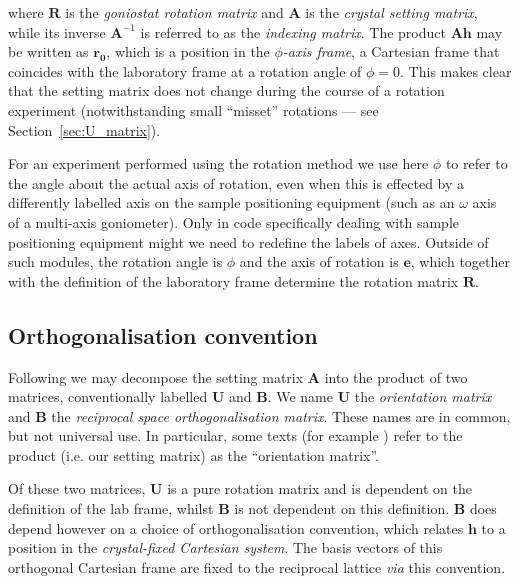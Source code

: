\documentclass[a4paper, 11pt]{article}
\renewcommand{\vec}[1]{\mathbf{#1}}
\begin{document}
where $\mathbf{R}$ is the \emph{goniostat rotation matrix} and $\mathbf{A}$ is
the \emph{crystal setting matrix}, while its inverse $\mathbf{A}^{-1}$ is referred
to as the \emph{indexing matrix}. The product $\mathbf{A} \vec{h}$ may be written
as $\vec{r_0}$, which is a position in the \emph{$\phi$-axis frame}, a
Cartesian frame that coincides with the laboratory frame at a rotation angle of
$\phi=0$. This makes
clear that the setting matrix does not change during the course of a rotation
experiment (notwithstanding small ``misset'' rotations --- see
Section~\ref{sec:U_matrix}).

For an
experiment performed using the rotation method we use here $\phi$ to refer
to the angle about the actual axis of rotation, even when this is effected
by a differently labelled axis on the sample positioning equipment (such as an
$\omega$ axis of a multi-axis goniometer). Only in code specifically dealing with
sample positioning equipment might we need to redefine the labels of axes.
Outside of such modules, the rotation angle is $\phi$ and the axis of rotation is
$\vec{e}$, which together with the definition of the laboratory frame determine
the rotation matrix $\mathbf{R}$.

\subsection{Orthogonalisation convention}

Following \citet{Busing1967diffractometers} we may decompose the setting matrix
$\mathbf{A}$ into the product of two matrices, conventionally labelled $\mathbf{U}$
and $\mathbf{B}$. We name $\mathbf{U}$ the \emph{orientation matrix} and
$\mathbf{B}$ the \emph{reciprocal space orthogonalisation matrix}. These names
are in common, but not universal use. In particular, some texts (for example
\citealt{Paciorek1999geometry}) refer to the product (i.e. our setting matrix)
as the ``orientation matrix''.

Of these two matrices, $\mathbf{U}$ is a
pure rotation matrix and is dependent on the definition of the lab frame, whilst
$\mathbf{B}$ is not dependent on this definition. $\mathbf{B}$ does depend however
on a choice of orthogonalisation convention, which relates $\vec{h}$ to a position
in the \emph{crystal-fixed Cartesian system}. The basis vectors of this orthogonal
Cartesian frame are fixed to the reciprocal lattice \textit{via} this convention.
\end{document}
